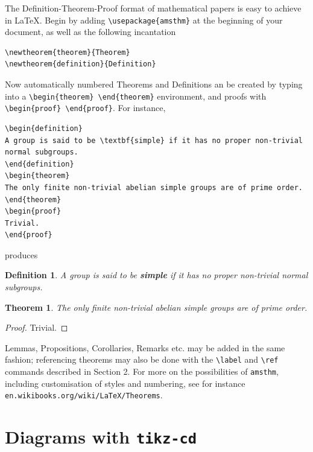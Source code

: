 \documentclass[11pt]{article}
\newtheorem{definition}{Definition}
\newtheorem{theorem}{Theorem}
\begin{document}
The Definition-Theorem-Proof format of mathematical papers is easy to achieve in \LaTeX. Begin by adding \verb$\usepackage{amsthm}$ at the beginning of your document, as well as the following incantation
\begin{verbatim}
\newtheorem{theorem}{Theorem}
\newtheorem{definition}{Definition}
\end{verbatim}
Now automatically numbered Theorems and Definitions an be created by typing into a \verb$\begin{theorem} \end{theorem}$ environment, and proofs with \verb$\begin{proof} \end{proof}$. For instance,
\begin{verbatim}
\begin{definition}
A group is said to be \textbf{simple} if it has no proper non-trivial normal subgroups. 
\end{definition}
\begin{theorem}
The only finite non-trivial abelian simple groups are of prime order.
\end{theorem}
\begin{proof}
Trivial.
\end{proof}
\end{verbatim}
produces
\begin{definition}
A group is said to be \textbf{simple} if it has no proper non-trivial normal subgroups. 
\end{definition}
\begin{theorem}
The only finite non-trivial abelian simple groups are of prime order.
\end{theorem}
\begin{proof}
Trivial.
\end{proof}

Lemmas, Propositions, Corollaries, Remarks etc. may be added in the same fashion; referencing theorems may also be done with the \verb$\label$ and \verb$\ref$ commands described in Section 2. For more on the possibilities of \texttt{amsthm}, including customisation of styles and numbering, see for instance \verb$en.wikibooks.org/wiki/LaTeX/Theorems$.

\section{Diagrams with \texttt{tikz-cd}}
\end{document}
